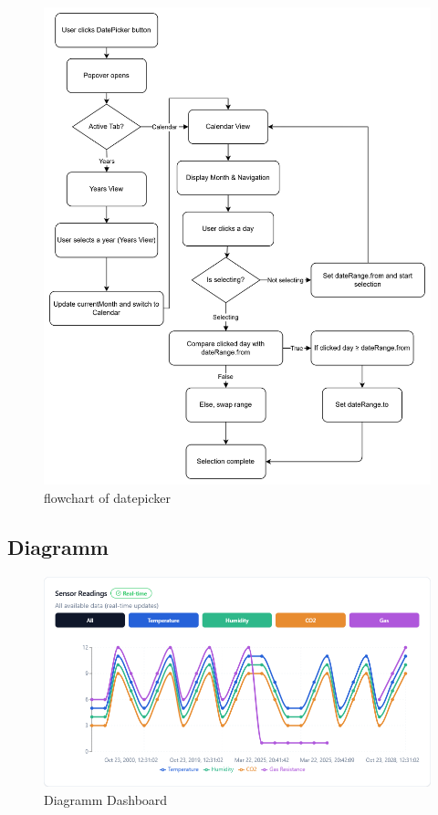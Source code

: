\begin{inhalt}
\begin{enumerate}[label=\textbf{\arabic*.}]
\begin{figure}[!htb]
\centering
\includegraphics[width=1\textwidth]{files/Thomas/pics/Website/dashbord/dashbaord-datepicker-flowchart.png}
\caption[Bildbezeichnung für Abbildungsverzeichnis]{flowchart of datepicker}
\label{fig:gehaeuse_internet_bild}
\end{figure}


\clearpage

\subsection{Diagramm}

\begin{figure}[!htb]
\centering
\includegraphics[width=1\textwidth]{files/Thomas/pics/Website/dashbord/chart.png}
\caption[Bildbezeichnung für Abbildungsverzeichnis]{Diagramm Dashboard}
\label{fig:Flowchart_Backend}
\end{figure}


\end{enumerate}
\end{inhalt}
